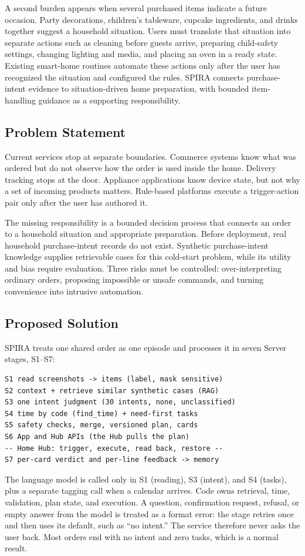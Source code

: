 \documentclass[conference]{IEEEtran}
\begin{document}
A second burden appears when several purchased items indicate a future occasion. Party decorations, children's tableware, cupcake ingredients, and drinks together suggest a household situation. Users must translate that situation into separate actions such as cleaning before guests arrive, preparing child-safety settings, changing lighting and media, and placing an oven in a ready state. Existing smart-home routines automate these actions only after the user has recognized the situation and configured the rules. SPIRA connects purchase-intent evidence to situation-driven home preparation, with bounded item-handling guidance as a supporting responsibility.

\subsection{Problem Statement}
Current services stop at separate boundaries. Commerce systems know what was ordered but do not observe how the order is used inside the home. Delivery tracking stops at the door. Appliance applications know device state, but not why a set of incoming products matters. Rule-based platforms execute a trigger-action pair only after the user has authored it.

The missing responsibility is a bounded decision process that connects an order to a household situation and appropriate preparation. Before deployment, real household purchase-intent records do not exist. Synthetic purchase-intent knowledge supplies retrievable cases for this cold-start problem, while its utility and bias require evaluation. Three risks must be controlled: over-interpreting ordinary orders, proposing impossible or unsafe commands, and turning convenience into intrusive automation.

\subsection{Proposed Solution}
SPIRA treats one shared order as one episode and processes it in seven Server stages, S1--S7:

\begin{lstlisting}
S1 read screenshots -> items (label, mask sensitive)
S2 context + retrieve similar synthetic cases (RAG)
S3 one intent judgment (30 intents, none, unclassified)
S4 time by code (find_time) + need-first tasks
S5 safety checks, merge, versioned plan, cards
S6 App and Hub APIs (the Hub pulls the plan)
-- Home Hub: trigger, execute, read back, restore --
S7 per-card verdict and per-line feedback -> memory
\end{lstlisting}
The language model is called only in S1 (reading), S3 (intent), and S4 (tasks), plus a separate tagging call when a calendar arrives. Code owns retrieval, time, validation, plan state, and execution. A question, confirmation request, refusal, or empty answer from the model is treated as a format error: the stage retries once and then uses its default, such as ``no intent.'' The service therefore never asks the user back. Most orders end with no intent and zero tasks, which is a normal result.
\end{document}
